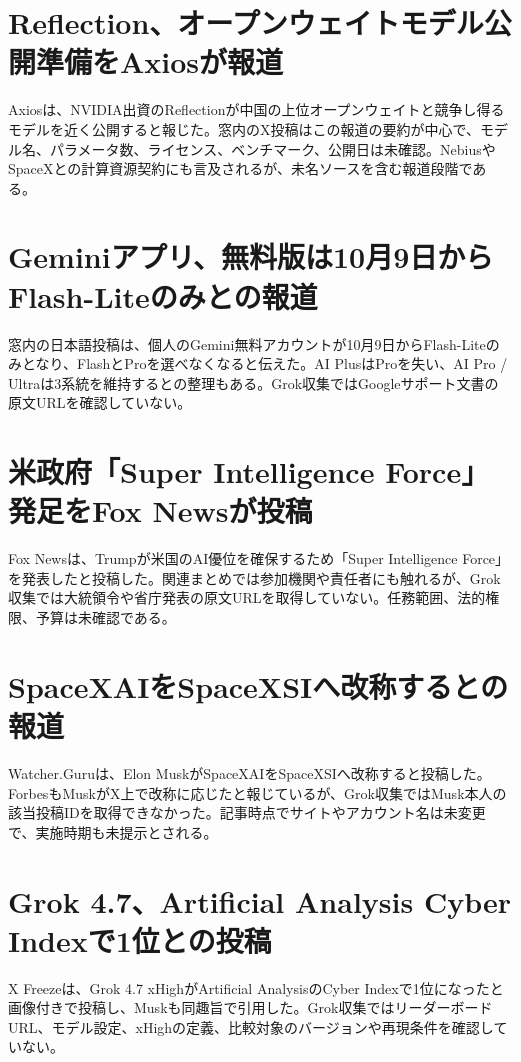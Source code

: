 \section{Reflection、オープンウェイトモデル公開準備をAxiosが報道}
Axiosは、NVIDIA出資のReflectionが中国の上位オープンウェイトと競争し得るモデルを近く公開すると報じた。窓内のX投稿はこの報道の要約が中心で、モデル名、パラメータ数、ライセンス、ベンチマーク、公開日は未確認。NebiusやSpaceXとの計算資源契約にも言及されるが、未名ソースを含む報道段階である。

\section{Geminiアプリ、無料版は10月9日からFlash-Liteのみとの報道}
窓内の日本語投稿は、個人のGemini無料アカウントが10月9日からFlash-Liteのみとなり、FlashとProを選べなくなると伝えた。AI PlusはProを失い、AI Pro / Ultraは3系統を維持するとの整理もある。Grok収集ではGoogleサポート文書の原文URLを確認していない。

\section{米政府「Super Intelligence Force」発足をFox Newsが投稿}
Fox Newsは、Trumpが米国のAI優位を確保するため「Super Intelligence Force」を発表したと投稿した。関連まとめでは参加機関や責任者にも触れるが、Grok収集では大統領令や省庁発表の原文URLを取得していない。任務範囲、法的権限、予算は未確認である。

\section{SpaceXAIをSpaceXSIへ改称するとの報道}
Watcher.Guruは、Elon MuskがSpaceXAIをSpaceXSIへ改称すると投稿した。ForbesもMuskがX上で改称に応じたと報じているが、Grok収集ではMusk本人の該当投稿IDを取得できなかった。記事時点でサイトやアカウント名は未変更で、実施時期も未提示とされる。

\section{Grok 4.7、Artificial Analysis Cyber Indexで1位との投稿}
X Freezeは、Grok 4.7 xHighがArtificial AnalysisのCyber Indexで1位になったと画像付きで投稿し、Muskも同趣旨で引用した。Grok収集ではリーダーボードURL、モデル設定、xHighの定義、比較対象のバージョンや再現条件を確認していない。

